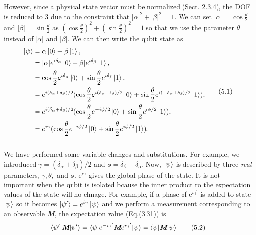 \documentclass{article}
\newcommand{\bfit}[1]{\textit{\textbf{#1}}}
\begin{document}
However, since a physical state vector must be normalized (Sect. 2.3.4), the DOF
is reduced to 3 due to the constraint that $|\alpha|^2+|\beta|^2=1$. 
We can set $|\alpha|=\cos{\frac{\theta}{2}}$ and $|\beta|=\sin{\frac{\theta}{2}}$ as 
$(\cos{\frac{\theta}{2}})^2+(\sin{\frac{\theta}{2}})^2=1$ so that we use the parameter
$\theta$ instead of $|\alpha|$ and $|\beta|$. We can then write the qubit state as
\begin{align} \label{eq 5.1}
    \begin{split}
        \ket{\psi} &= \alpha\ket{0}+\beta\ket{1},\\
        &= |\alpha|e^{i\delta_{\alpha}}\ket{0}+\beta|e^{i\delta_{\beta}}\ket{1},\\
        &= \cos{\frac{\theta}{2}}e^{i\delta_{\alpha}}\ket{0}+\sin{\frac{\theta}{2}}e^{i\delta_{\beta}}\ket{1},\\
        &=e^{i(\delta_{\alpha}+\delta_{\beta})/2}(\cos{\frac{\theta}{2}}e^{i(\delta_{\alpha}-\delta_{\beta})/2}\ket{0}
        +\sin{\frac{\theta}{2}}e^{i(-\delta_{\alpha}+\delta_{\beta})/2}\ket{1}),\\
        &=e^{i(\delta_{\alpha}+\delta_{\beta})/2}(\cos{\frac{\theta}{2}}e^{-i\phi/2}\ket{0}
        +\sin{\frac{\theta}{2}}e^{i\phi/2}\ket{1}),\\
        &=e^{i\gamma}(\cos{\frac{\theta}{2}}e^{-i\phi/2}\ket{0}+\sin{\frac{\theta}{2}}e^{i\phi/2}\ket{1}).
    \end{split}\tag{5.1}
\end{align}\\
We have performed some variable changes and substitutions. For example, we introduced
$\gamma=(\delta_{\alpha}+\delta_{\beta})/2$ and $\phi=\delta_{\beta}-\delta_{\alpha}$.
Now, $\ket{\psi}$ is described by three \textit{real} parameters, $\gamma, \theta,$ and $\phi$. e$^{i\gamma}$ gives the global phase of the state. It is not important when 
the qubit is isolated bcause the inner product ro the expectation values of the state will no chnage. For 
example, if a phase of e$^{i\gamma^{\prime}}$ is added to state $\ket{\psi}$ so it becomes 
$\ket{\psi^{\prime}}=e^{i\gamma}\ket{\psi}$ and we perform a measurement corresponding
to an observable \bfit{M},  the expectation value (Eq.(3.31)) is
\begin{equation} \label{eq 5.2}
    \braket{\psi^{\prime}|\bfit{M}|\psi^{\prime}}=\braket{\psi|e^{-i\gamma^{\prime}}\bfit{M}e^{i\gamma^{\prime}}|\psi}
    =\braket{\psi|\bfit{M}|\psi} \tag{5.2}
\end{equation}
\\
\end{document}
